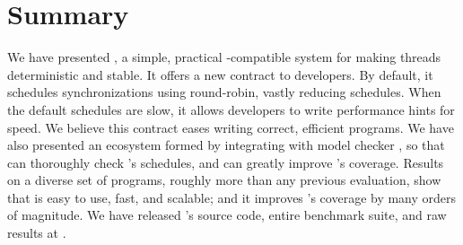 \vspace{-.05in}
\section{Summary} \label{sec:parrot-summary}
\vspace{-.05in}

We have presented \parrot, a simple, practical \pthread-compatible system for
making threads deterministic and stable. It offers a new contract to
developers.  By default, it schedules synchronizations using round-robin,
vastly reducing schedules.  When the default schedules are slow, it
allows developers to write performance hints for speed.  We believe this
contract eases writing correct, efficient programs.  We have
also presented an ecosystem formed by integrating \parrot with model checker
\dbug, so that \dbug can thoroughly check \parrot's schedules, and \parrot can
greatly improve \dbug's coverage.  Results on a diverse set of \nprog
programs, roughly \overeach more than any previous evaluation,
show that \parrot is easy to use, fast, and scalable; and it improves \dbug's
coverage by many orders of magnitude.  We have released \parrot's source
code, entire benchmark suite, and raw results at \github.
